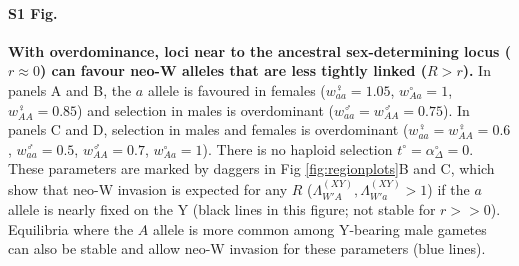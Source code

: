 \documentclass[10pt,letterpaper]{article}
\begin{document}
\paragraph*{S1 Fig.}
\label{fig:positionOverdominance}
{\bf With overdominance, loci near to the ancestral sex-determining locus ($r\approx0$) can favour neo-W alleles that are less tightly linked ($R>r$).} 
In panels A and B, the $a$ allele is favoured in females ($w_{aa}^\female=1.05$, $w_{Aa}^\circ=1$, $w_{AA}^\female=0.85$) and selection in males is overdominant ($w_{aa}^\male=w_{AA}^\male=0.75$).
In panels C and D, selection in males and females is overdominant ($w_{aa}^\female=w_{AA}^\female=0.6$, $w_{aa}^\male=0.5$, $w_{AA}^\male=0.7$, $w_{Aa}^\circ=1$).
There is no haploid selection $t^\circ = \alpha^\circ_\Delta = 0$.
These parameters are marked by daggers in Fig \ref{fig:regionplots}B and C, which show that neo-W invasion is expected for any $R$ ($\Lambda_{W'A}^{(XY)},\Lambda_{W'a}^{(XY)}>1$) if the $a$ allele is nearly fixed on the Y (black lines in this figure; not stable for $r>>0$). 
Equilibria where the $A$ allele is more common among Y-bearing male gametes can also be stable and allow neo-W invasion for these parameters (blue lines). 
\end{document}
